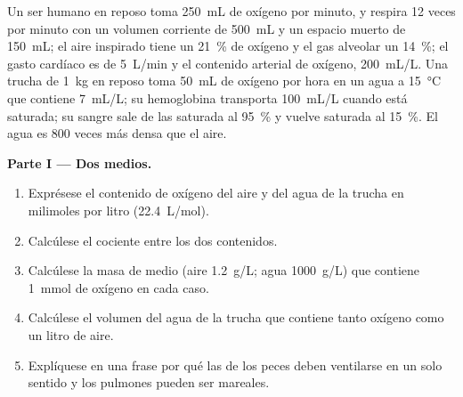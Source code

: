 \begin{problem}
\label{pb:b1:gas-exchange:1}
Un ser humano en reposo toma \qty{250}{mL} de oxígeno por minuto, y respira
\qty{12}{} veces por minuto con un volumen corriente de \qty{500}{mL} y un
espacio muerto de \qty{150}{mL}; el aire inspirado tiene un \qty{21}{\%} de
oxígeno y el gas alveolar un \qty{14}{\%}; el gasto cardíaco es de
\qty{5}{L/min} y el contenido arterial de oxígeno, \qty{200}{mL/L}. Una
trucha de \qty{1}{kg} en reposo toma \qty{50}{mL} de oxígeno por hora en un
agua a \qty{15}{\celsius} que contiene \qty{7}{mL/L}; su hemoglobina
transporta \qty{100}{mL/L} cuando está saturada; su sangre sale de las
 saturada al \qty{95}{\%} y vuelve saturada al \qty{15}{\%}. El
agua es \qty{800}{} veces más densa que el aire.

\medskip
\noindent\textbf{Parte I --- Dos medios.}
\begin{enumerate}
  \item Exprésese el contenido de oxígeno del aire y del agua de la trucha
        en milimoles por litro (\qty{22.4}{L/mol}).
  \item Calcúlese el cociente entre los dos contenidos.
  \item Calcúlese la masa de medio (aire \qty{1.2}{g/L}; agua
        \qty{1000}{g/L}) que contiene \qty{1}{mmol} de oxígeno en cada
        caso.
  \item Calcúlese el volumen del agua de la trucha que contiene tanto
        oxígeno como un litro de aire.
  \item Explíquese en una frase por qué las  de los peces deben
        ventilarse en un solo sentido y los pulmones pueden ser mareales.
\end{enumerate}


\end{problem}
